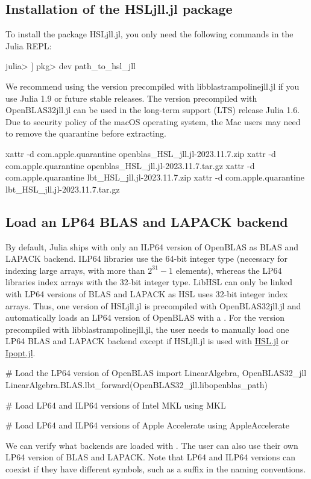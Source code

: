 \documentclass[gdweb]{geradwp}
\renewcommand{\_}{\raisebox{+0.35mm}{\textunderscore}}
\newcommand{\LibHSL}{LibHSL\xspace}
\newcommand{\HSLjll}{HSL\_jll.jl\xspace}
\newcommand{\LBTjll}{libblastrampoline\_jll.jl\xspace}
\newcommand{\OpenBLASjll}{OpenBLAS32\_jll.jl\xspace}
\begin{document}
\subsection{Installation of the \HSLjll package}

To install the package \HSLjll, you only need the following commands in the Julia REPL:
\begin{jllisting}
julia> ]
pkg> dev path_to_hsl_jll
\end{jllisting}
We recommend using the version precompiled with \LBTjll if you use Julia 1.9 or future stable releases.
The version precompiled with \OpenBLASjll can be used in the long-term support (LTS) release Julia 1.6.
Due to security policy of the macOS operating system, the Mac users may need to remove the quarantine before extracting.
\begin{jllisting}
xattr -d com.apple.quarantine openblas_HSL_jll.jl-2023.11.7.zip
xattr -d com.apple.quarantine openblas_HSL_jll.jl-2023.11.7.tar.gz
xattr -d com.apple.quarantine lbt_HSL_jll.jl-2023.11.7.zip
xattr -d com.apple.quarantine lbt_HSL_jll.jl-2023.11.7.tar.gz
\end{jllisting}

\subsection{Load an LP64 BLAS and LAPACK backend}

By default, Julia ships with only an ILP64 version of OpenBLAS as BLAS and LAPACK backend.
ILP64 libraries use the 64-bit integer type (necessary for indexing large arrays, with more than $2^{31}-1$ elements), whereas the LP64 libraries index arrays with the 32-bit integer type.
\LibHSL can only be linked with LP64 versions of BLAS and LAPACK as HSL uses 32-bit integer index arrays.
Thus, one version of \HSLjll is precompiled with \OpenBLASjll and automatically loads an LP64 version of OpenBLAS with a .
For the version precompiled with \LBTjll, the user needs to manually load one LP64 BLAS and LAPACK backend except if \HSLjll is used with \href{https://github.com/JuliaSmoothOptimizers/HSL.jl}{HSL.jl} \citep{montoison-orban-hsl-2021} or \href{https://github.com/jump-dev/Ipopt.jl}{Ipopt.jl}.
\begin{jllisting}
# Load the LP64 version of OpenBLAS
import LinearAlgebra, OpenBLAS32_jll
LinearAlgebra.BLAS.lbt_forward(OpenBLAS32_jll.libopenblas_path)

# Load LP64 and ILP64 versions of Intel MKL
using MKL

# Load LP64 and ILP64 versions of Apple Accelerate
using AppleAccelerate
\end{jllisting}
We can verify what backends are loaded with .
The user can also use their own LP64 version of BLAS and LAPACK.
Note that LP64 and ILP64 versions can coexist if they have different symbols, such as a suffix \jlinl{\_64} in the naming conventions.
\end{document}
